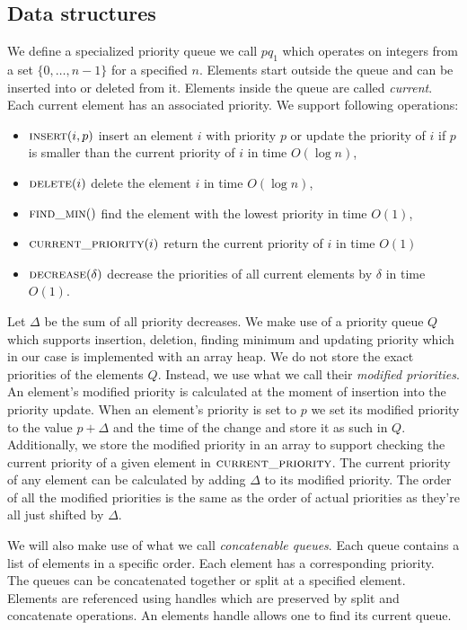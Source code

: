 \subsection{Data structures}

We define a specialized priority queue we call $pq_1$ which operates on integers from a set $\{0, \dots, n-1\}$ for a specified $n$. Elements start outside the queue and can be inserted into or deleted from it. Elements inside the queue are called \textit{current}. Each current element has an associated priority. We support following operations:

\begin{itemize}
    \item $\textsc{insert}(i, p)$ insert an element $i$ with priority $p$ or update the priority of $i$ if $p$ is smaller than the current priority of $i$ in time $O(\log n)$,
    \item $\textsc{delete}(i)$ delete the element $i$ in time $O(\log n)$,
    \item $\textsc{find\_min}()$ find the element with the lowest priority in time $O(1)$,
    \item $\textsc{current\_priority}(i)$ return the current priority of $i$ in time $O(1)$
    \item $\textsc{decrease}(\delta)$ decrease the priorities of all current elements by $\delta$ in time $O(1)$.
\end{itemize}

Let $\Delta$ be the sum of all priority decreases. We make use of a priority queue $Q$ which supports insertion, deletion, finding minimum and updating priority which in our case is implemented with an array heap. We do not store the exact priorities of the elements  $Q$. Instead, we use what we call their \textit{modified priorities}. An element's modified priority is calculated at the moment of insertion into the priority update. When an element's priority is set to $p$ we set its modified priority to the value $p + \Delta$ and the time of the change and store it as such in $Q$. Additionally, we store the modified priority in an array to support checking the current priority of a given element in $\textsc{current\_priority}$. The current priority of any element can be calculated by adding $\Delta$ to its modified priority. The order of all the modified priorities is the same as the order of actual priorities as they're all just shifted by $\Delta$.

We will also make use of what we call \textit{concatenable queues}. Each queue contains a list of elements in a specific order. Each element has a corresponding priority. The queues can be concatenated together or split at a specified element. Elements are referenced using handles which are preserved by split and concatenate operations. An elements handle allows one to find its current queue.

